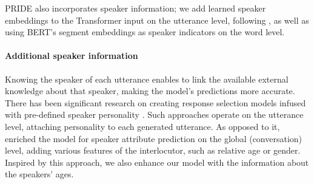 PRIDE also incorporates speaker information; we add learned speaker embeddings to the Transformer input on the utterance level, following \citet{li2020hierarchical}, as well as using BERT's segment embeddings as speaker indicators on the word level.

\paragraph{Additional speaker information}
Knowing the speaker of each utterance enables to link the available external knowledge about that speaker, making the model's predictions more accurate. There has been significant research on creating response selection models infused with pre-defined speaker personality \cite{mazare2018training, zhang2018personalizing}. Such approaches operate on the utterance level, attaching personality to each generated utterance. As opposed to it, \citet{welch2019look} enriched the model for speaker attribute prediction on the global (conversation) level, adding various features of the interlocutor, such as relative age or gender. Inspired by this approach, we also enhance our model with the information about the speakers' ages.



